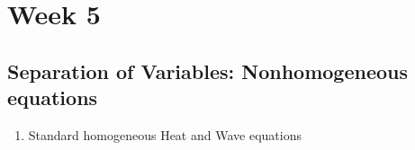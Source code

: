 \chapter{Week 5}
\setcounter{weekpage}{1}
\thispagestyle{plainweek}

\section[Separation of Variables]{Separation of Variables: Nonhomogeneous equations}

\begin{enumerate}


\item Standard homogeneous Heat and Wave equations

\end{enumerate}


